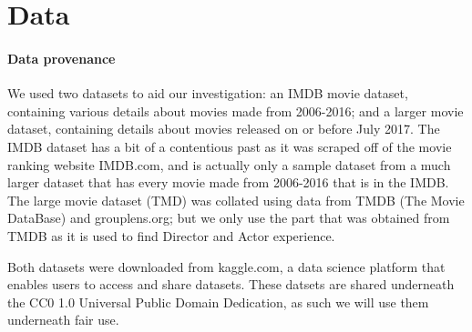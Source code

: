 \section{Data}

    \paragraph{Data provenance}
        We used two datasets to aid our investigation: an IMDB movie dataset, containing
            various details about movies made from 2006-2016; and a larger movie dataset,
            containing details about movies released on or before July 2017.
        The IMDB dataset has a bit of a contentious past as it was scraped off of the movie
            ranking website IMDB.com, and is actually only a sample dataset from a much larger
            dataset that has every movie made from 2006-2016 that is in the IMDB.
        The large movie dataset (TMD) was collated using data from TMDB (The Movie DataBase) and 
            grouplens.org; but we only use the part that was obtained from TMDB as it is used
            to find Director and Actor experience.

        Both datasets were downloaded from kaggle.com, a data science platform that enables users
            to access and share datasets. These datsets are shared underneath the CC0 1.0 Universal
            Public Domain Dedication, as such we will use them underneath fair use.

